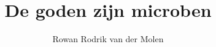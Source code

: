 \documentclass{article}[a4paper]
\begin{document}
\title{De goden zijn microben}
\author{Rowan Rodrik van der Molen}
\maketitle
\end{document}
